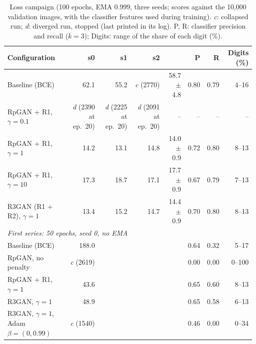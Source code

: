 \begin{table}[H]
\centering
\footnotesize
\setlength{\tabcolsep}{4pt}
\begin{tabular}{lrrrrrrr}
\toprule
Configuration & s0 & s1 & s2 & \fcnn{} & P & R & Digits (\%) \\
\midrule
Baseline (BCE) & 62.1 & 55.2 & \textit{c} (2770) & 58.7 $\pm$ 4.8 & 0.80 & 0.79 & 4--16 \\
RpGAN + R1, $\gamma=0.1$ & \textit{d} (2390 at ep.\ 20) & \textit{d} (2225 at ep.\ 20) & \textit{d} (2091 at ep.\ 20) & -- & -- & -- & -- \\
RpGAN + R1, $\gamma=1$ & 14.2 & 13.1 & 14.8 & 14.0 $\pm$ 0.9 & 0.72 & 0.80 & 8--13 \\
RpGAN + R1, $\gamma=10$ & 17.3 & 18.7 & 17.1 & 17.7 $\pm$ 0.9 & 0.67 & 0.79 & 7--13 \\
R3GAN (R1 + R2), $\gamma=1$ & 13.4 & 15.2 & 14.7 & 14.4 $\pm$ 0.9 & 0.70 & 0.80 & 8--13 \\
\midrule
\multicolumn{8}{l}{\textit{First series: 50 epochs, seed 0, no EMA}} \\
Baseline (BCE) & 188.0 &  &  &  & 0.64 & 0.32 & 5--17 \\
RpGAN, no penalty & \textit{c} (2619) &  &  &  & 0.00 & 0.00 & 0--100 \\
RpGAN + R1, $\gamma=1$ & 43.6 &  &  &  & 0.65 & 0.60 & 8--13 \\
R3GAN, $\gamma=1$ & 48.9 &  &  &  & 0.65 & 0.58 & 6--13 \\
R3GAN, $\gamma=1$, Adam $\beta=(0, 0.99)$ & \textit{c} (1540) &  &  &  & 0.46 & 0.00 & 0--34 \\
\bottomrule
\end{tabular}
\caption{Loss campaign (100 epochs, EMA 0.999, three seeds; scores against the 10,000 validation images, with the classifier features used during training). \textit{c}: collapsed run; \textit{d}: diverged run, stopped (last \fcnn{} printed in its log). P, R: classifier precision and recall ($k=3$); Digits: range of the share of each digit (\%).}
\label{tab:supp-campaign}
\end{table}
